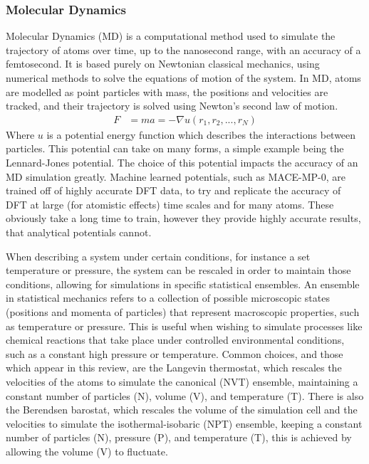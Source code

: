 \documentclass[10pt,a4paper,twocolumn,twoside]{extarticle}
\begin{document}
\subsubsection{Molecular Dynamics}
Molecular Dynamics (MD) is a computational method used to simulate the trajectory of atoms over time, up to the nanosecond range, with an accuracy of a femtosecond. It is based purely on Newtonian classical mechanics, using numerical methods to solve the equations of motion of the system. In MD, atoms are modelled as point particles with mass, the positions and velocities are tracked, and their trajectory is solved using Newton's second law of motion.
\begin{align*}
	F &= ma = -\nabla u(r_1, r_2, ..., r_N)
\end{align*}
Where $u$ is a potential energy function which describes the interactions between particles. This potential can take on many forms, a simple example being the Lennard-Jones potential. The choice of this potential impacts the accuracy of an MD simulation greatly. Machine learned potentials, such as MACE-MP-0\cite{MACE}, are trained off of highly accurate DFT data, to try and replicate the accuracy of DFT at large (for atomistic effects) time scales and for many atoms. These obviously take a long time to train, however they provide highly accurate results, that analytical potentials cannot. 


When describing a system under certain conditions, for instance a set temperature or pressure, the system can be rescaled in order to maintain those conditions, allowing for simulations in specific statistical ensembles. An ensemble in statistical mechanics refers to a collection of possible microscopic states (positions and momenta of particles) that represent macroscopic properties, such as temperature or pressure. This is useful when wishing to simulate processes like chemical reactions that take place under controlled environmental conditions, such as a constant high pressure or temperature. Common choices, and those which appear in this review, are the Langevin thermostat, which rescales the velocities of the atoms to simulate the canonical (NVT) ensemble, maintaining a constant number of particles (N), volume (V), and temperature (T). There is also the Berendsen barostat, which rescales the volume of the simulation cell and the velocities to simulate the isothermal-isobaric (NPT) ensemble, keeping a constant number of particles (N), pressure (P), and temperature (T), this is achieved by allowing the volume (V) to fluctuate.
\end{document}
